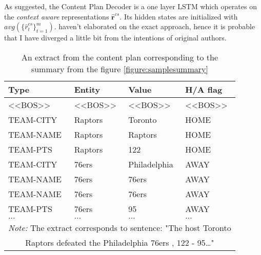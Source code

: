 As suggested, the Content Plan Decoder is a one layer LSTM which operates on the \emph{context aware} representations $\hat{\boldsymbol{r}}^{cs}$. Its hidden states are initialized with $avg(\{\hat{r}_t^{cs}\}_{t=1}^m)$. \citep{puduppully2019datatotext} haven't elaborated on the exact approach, hence it is probable that I have diverged a little bit from the intentions of original authors.

\begin{table}[h]
    \centering \small
    \begin{tabular}{llll}
        \toprule
        \textbf{Type} & \textbf{Entity} & \textbf{Value} & \textbf{H/A flag} \\                  
        \midrule
        \textless{}\textless{}BOS\textgreater{}\textgreater{} & \textless{}\textless{}BOS\textgreater{}\textgreater{} & \textless{}\textless{}BOS\textgreater{}\textgreater{} & \textless{}\textless{}BOS\textgreater{}\textgreater{} \\
        TEAM-CITY    & Raptors      & Toronto      & HOME                                                  \\
        TEAM-NAME    & Raptors      & Raptors      & HOME                                                  \\
        TEAM-PTS     & Raptors      & 122          & HOME                                                  \\
        TEAM-CITY    & 76ers        & Philadelphia & AWAY                                                  \\
        TEAM-NAME    & 76ers        & 76ers        & AWAY                                                  \\
        TEAM-NAME    & 76ers        & 76ers        & AWAY                                                  \\
        TEAM-PTS     & 76ers        & 95           & AWAY                                                  \\
        $\dots$      & $\dots$      & $\dots$      & $\dots$ \\                                        
        \bottomrule
        \multicolumn{4}{c}{\footnotesize \textit{Note:} The extract corresponds to sentence: "The host Toronto} \\
        \multicolumn{4}{c}{\footnotesize Raptors defeated the Philadelphia 76ers , 122 - 95\dots "}
    \end{tabular}
    \caption{An extract from the content plan corresponding to the summary from the figure \ref{figure:samplesummary}}
\end{table}

